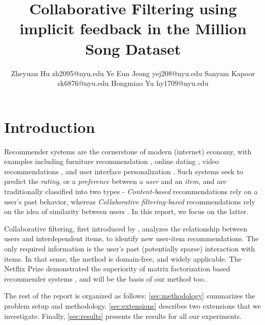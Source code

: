 \documentclass{article}
\begin{document}
\title{Collaborative Filtering using implicit feedback in the Million Song Dataset}

\author{%
\name Zheyuan Hu \email zh2095@nyu.edu \AND
\name Ye Eun Jeong \email yej208@nyu.edu \AND
\name Sanyam Kapoor \email sk6876@nyu.edu \AND
\name Hongmiao Yu \email hy1709@nyu.edu
}


\maketitle

%

\vspace{-2em}

\section{Introduction}

Recommender systems are the cornerstone of modern (internet) economy, with 
examples including furniture recommendation 
\citep{10.1145/3383313.3411550}, online dating 
\citep{10.1145/3383313.3411558}, video recommendations 
\citep{10.1145/3383313.3411555}, and user interface personalization 
\citep{10.1145/3383313.3411549}. Such systems seek to predict the 
\emph{rating}, or a \emph{preference} between a \emph{user} and an 
\emph{item}, and are traditionally classified into two types - 
\emph{Content-based} recommendations rely on a user's past behavior, 
whereas \emph{Collaborative filtering-based} recommendations rely on the 
idea of similarity between users \citep{Pazzani2004AFF}. In this report, we 
focus on the latter.

Collaborative filtering, first introduced by \citet{Goldberg1992UsingCF}, 
analyzes the relationship between users and interdependent items, to 
identify new user-item recommendations. The only required information is 
the user's past (potentially sparse) interaction with items. In that sense, 
the method is domain-free, and widely applicable. The Netflix Prize 
\citep{Bennett07thenetflix} demonstrated the superiority of matrix 
factorization based recommender systems \citep{koren2009}, and will be the 
basis of our method too.

The rest of the report is organized as follows: \cref{sec:methodology} 
summarizes the problem setup and methodology. \cref{sec:extensions} 
describes two extensions that we investigate. Finally, \cref{sec:results} 
presents the results for all our experiments.
\end{document}

